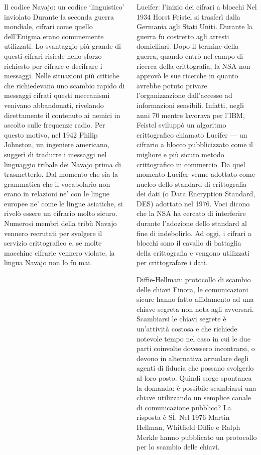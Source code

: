 \documentclass[final,hyperref={pdfpagelabels=false}]{beamer}
\begin{document}
\begin{frame}{}
\begin{columns}[t]
\begin{column}{.3\linewidth}
\begin{block}{Il codice Navajo: un codice `linguistico' inviolato}
          Durante la seconda guerra mondiale, cifrari come quello dell'Enigma erano comunemente utilizzati. Lo svantaggio più grande di questi cifrari risiede nello sforzo richiesto per cifrare e decifrare i messaggi. Nelle situazioni più critiche che richiedevano uno scambio rapido di messaggi cifrati questi meccanismi venivano abbandonati, rivelando direttamente il contenuto ai nemici in ascolto sulle frequenze radio. Per questo motivo, nel 1942 Philip Johnston, un ingeniere americano, suggerì di tradurre i messaggi nel linguaggio tribale dei Navajo prima di trasmetterlo. Dal momento che sia la grammatica che il vocabolario non erano in relazioni ne' con le lingue europee ne' come le lingue asiatiche, si rivelò essere un cifrario molto sicuro. Numerosi membri della tribù Navajo vennero recrutati per svolgere il servizio crittografico e, se molte macchine cifrarie vennero violate, la lingua Navajo non lo fu mai.
        \end{block}

    \end{column}
    \begin{column}{.3\linewidth}
        \begin{block}{Lucifer: l'inizio dei cifrari a blocchi}
          Nel 1934 Horst Feistel si trasferì dalla Germania agli Stati Uniti. Durante la guerra fu costretto agli arresti domiciliari. Dopo il termine della guerra, quando entrò nel campo di ricerca della crittografia, la NSA non approvò le sue ricerche in quanto avrebbe potuto privare l'organizzazione dall'accesso ad informazioni sensibili. Infatti, negli anni 70 mentre lavorava per l'IBM, Feistel sviluppò un algoritmo crittografico chiamato Lucifer --- un cifrario a blocco pubblicizzato come il migliore e più sicuro metodo crittografico in commercio. Da quel momento Lucifer venne adottato come nucleo dello standard di crittografia dei dati (o Data Encryption Standard, DES) adottato nel 1976. Voci dicono che la NSA ha cercato di interferire durante l'adozione dello standard al fine di indebolirlo. Ad oggi, i cifrari a blocchi sono il cavallo di battaglia della crittografia e vengono utilizzati per crittografare i dati.
        \end{block}

        \begin{block}{Diffie-Hellman: protocollo di scambio delle chiavi}
          Finora, le comunicazioni sicure hanno fatto affidamento ad una chiave segreta non nota agli avversari. Scambiarsi le chiavi segrete è un'attività costosa e che richiede notevole tempo nel caso in cui le due parti coinvolte dovessero incontrarsi, o devono in alternativa arruolare degli agenti di fiducia che possano svolgerlo al loro posto. Quindi sorge spontanea la domanda: è possibile scambiarsi una chiave utilizzando un semplice canale di comunicazione pubblico? La risposta è SÌ. Nel 1976 Martin Hellman, Whitfield Diffie e Ralph Merkle hanno pubblicato un protocollo per lo scambio delle chiavi.
        \end{block}


\end{column}
\end{columns}
\end{frame}
\end{document}
